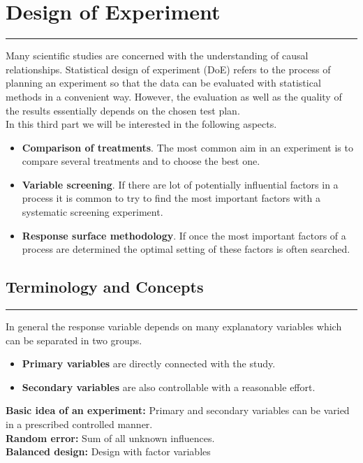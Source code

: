 \section{Design of Experiment}
\noindent\rule[\linienAbstand]{\linewidth}{\linienDickeDick}
Many scientific studies are concerned with the understanding of causal relationships. Statistical design of experiment (DoE) refers to the process of planning an experiment so that the data can be evaluated with statistical methods in a convenient way. However, the evaluation as well as the quality of the results essentially depends on the chosen test plan.\\

In this third part we will be interested in the following aspects.
\begin{itemize}
  \item \textbf{Comparison of treatments}. The most common aim in an experiment is to compare several treatments and to choose the best one.
  \item \textbf{Variable screening}. If there are lot of potentially influential factors in a process it is common to try to find the most important factors with a systematic screening experiment.
  \item \textbf{Response surface methodology}. If once the most important factors of a process are determined the optimal setting of these factors is often searched.
\end{itemize}

\subsection{Terminology and Concepts}
\noindent\rule[\linienAbstand]{\linewidth}{\linienDicke}
In general the response variable depends on many explanatory variables which can be separated in two groups.
\begin{itemize}
  \item \textbf{Primary variables} are directly connected with the study.
  \item \textbf{Secondary variables} are also controllable with a reasonable effort.
\end{itemize}
\textbf{Basic idea of an experiment:} Primary and secondary variables can be varied in a prescribed controlled manner.\\

\textbf{Random error:} Sum of all unknown influences.\\

\textbf{Balanced design:} Design with factor variables\\

